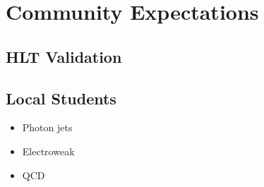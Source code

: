 \documentclass{beamer}
\begin{document}
\section{Community Expectations}
\subsection{HLT Validation}
\begin{frame}
\end{frame}

\subsection{Local Students}
\begin{frame}
\begin{itemize}
    \item Photon jets
    \item Electroweak
    \item QCD
\end{itemize}
\end{frame}
\end{document}
